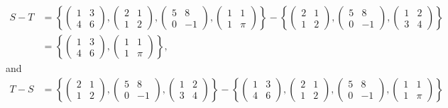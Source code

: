\documentclass[12pt]{article}
\numberwithin{theorem}{section}
\numberwithin{equation}{section}
\numberwithin{remark}{section}
\numberwithin{definition}{section}
\numberwithin{theorem}{section}
\numberwithin{lemma}{section}
\numberwithin{example}{section}
\begin{document}
\begin{itemize}
{		\begin{align*}
			S-T & = \left\{\begin{pmatrix} 1 & 3 \\ 4 & 6 \end{pmatrix}, \begin{pmatrix} 2 & 1 \\ 1 & 2 \end{pmatrix}, \begin{pmatrix} 5 & 8 \\ 0 & -1 \end{pmatrix}, \begin{pmatrix} 1 & 1 \\ 1 & \pi \end{pmatrix}\right\} - \left\{\begin{pmatrix} 2 & 1 \\ 1 & 2 \end{pmatrix}, \begin{pmatrix} 5 & 8 \\ 0 & -1 \end{pmatrix}, \begin{pmatrix} 1 & 2 \\ 3 & 4 \end{pmatrix}\right\} \\
 			& = \left\{\begin{pmatrix} 1 & 3 \\ 4 & 6 \end{pmatrix}, \begin{pmatrix} 1 & 1 \\ 1 & \pi \end{pmatrix}\right\},
 		\end{align*}
 		and
		\begin{align*}
			T-S & = \left\{\begin{pmatrix} 2 & 1 \\ 1 & 2 \end{pmatrix}, \begin{pmatrix} 5 & 8 \\ 0 & -1 \end{pmatrix}, \begin{pmatrix} 1 & 2 \\ 3 & 4 \end{pmatrix}\right\} - \left\{\begin{pmatrix} 1 & 3 \\ 4 & 6 \end{pmatrix}, \begin{pmatrix} 2 & 1 \\ 1 & 2 \end{pmatrix}, \begin{pmatrix} 5 & 8 \\ 0 & -1 \end{pmatrix}, \begin{pmatrix} 1 & 1 \\ 1 & \pi \end{pmatrix}\right\} \\

\end{align*}}
\end{itemize}
\end{document}
